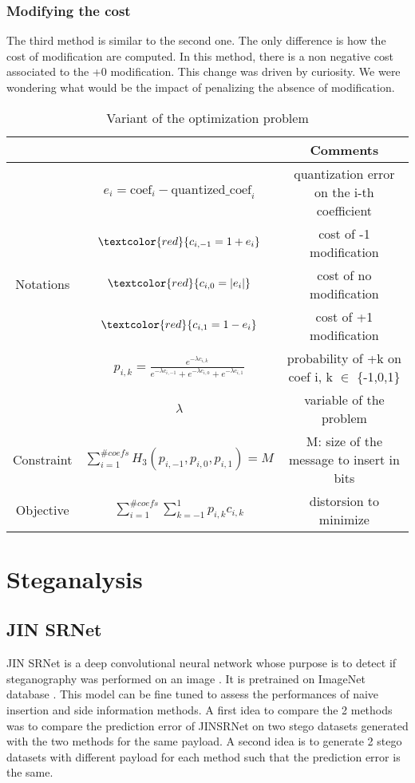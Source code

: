 \documentclass[12pt]{article}
\begin{document}
\subsubsection{Modifying the cost}
The third method is similar to the second one. The only difference is how the cost of modification are computed. In this method, there is a non negative cost associated to the +0 modification. This change was driven by curiosity. We were wondering what would be the impact of penalizing the absence of modification.
\begin{table}[H]
\begin{tabular}{ |c|c|c| }
    \hline
    &  & Comments\\
    \hline
    & $e_i = \text{coef}_i - \text{quantized\_coef}_i$ & quantization error on the i-th coefficient\\ 
    & $\textcolor{red}{c_{i,-1} = 1 + e_i}$ & cost of -1 modification\\ 
    Notations & $\textcolor{red}{c_{i,0} = |e_i|}$ & cost of no modification\\
    & $\textcolor{red}{c_{i,1} = 1 - e_i}$ & cost of +1 modification\\
    & $p_{i,k} = \frac{e^{-\lambda c_{i,k}}}{e^{-\lambda c_{i,-1}} + e^{-\lambda c_{i,0}} + e^{-\lambda c_{i,1}}}$ & probability of +k on coef i, k $\in$ \{-1,0,1\}\\
    & $\lambda$ & variable of the problem\\
    \hline
    Constraint & $\displaystyle\sum_{i=1}^{\# coefs}{H_3(p_{i,-1},p_{i,0},p_{i,1})} = M$ & M: size of the message to insert in bits\\
    \hline
    Objective & $\displaystyle\sum_{i=1}^{\# coefs}{\sum_{k=-1}^{1}{p_{i,k}c_{i,k}}}$ & distorsion to minimize \\ 
    \hline
\end{tabular}
\caption[Side information variant]{Variant of the optimization problem}
\end{table}

\section{Steganalysis}
\subsection{JIN SRNet}
JIN SRNet is a deep convolutional neural network whose purpose is to detect if steganography was performed on an image \autocite{liuLosslessImageSteganography2022}. It is pretrained on ImageNet database \autocite{butoraRevisitingPerturbedQuantization2021}. This model can be fine tuned to assess the performances of naive insertion and side information methods. A first idea to compare the 2 methods was to compare the prediction error of JINSRNet on two stego datasets generated with the two methods for the same payload. A second idea is to generate 2 stego datasets with different payload for each method such that the prediction error is the same. 
\end{document}
